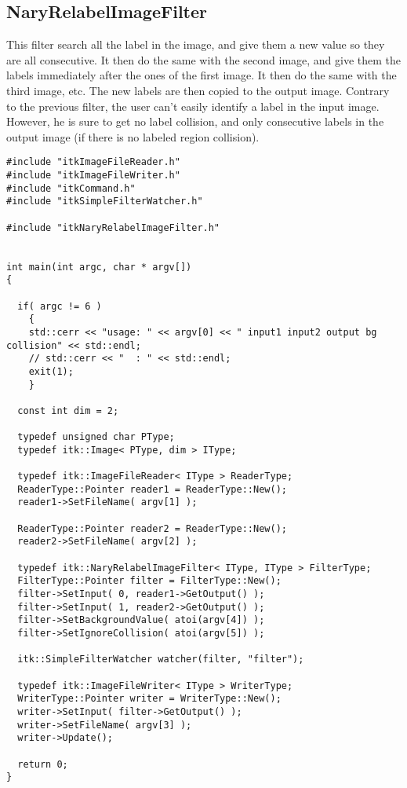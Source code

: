\documentclass{InsightArticle}
\begin{document}
\subsection{NaryRelabelImageFilter}

This filter search all the label in the image, and give them a new value so they are all
consecutive. It then do the same with the second image, and give them the labels immediately
after the ones of the first image. It then do the same with the third image, etc.
The new labels are then copied to the output image.
Contrary to the previous filter, the user can't easily identify a label in the input image.
However, he is sure to get no label collision, and only consecutive labels in the output image
(if there is no labeled region collision).

\small \begin{verbatim}
#include "itkImageFileReader.h"
#include "itkImageFileWriter.h"
#include "itkCommand.h"
#include "itkSimpleFilterWatcher.h"

#include "itkNaryRelabelImageFilter.h"


int main(int argc, char * argv[])
{

  if( argc != 6 )
    {
    std::cerr << "usage: " << argv[0] << " input1 input2 output bg collision" << std::endl;
    // std::cerr << "  : " << std::endl;
    exit(1);
    }

  const int dim = 2;
  
  typedef unsigned char PType;
  typedef itk::Image< PType, dim > IType;

  typedef itk::ImageFileReader< IType > ReaderType;
  ReaderType::Pointer reader1 = ReaderType::New();
  reader1->SetFileName( argv[1] );

  ReaderType::Pointer reader2 = ReaderType::New();
  reader2->SetFileName( argv[2] );

  typedef itk::NaryRelabelImageFilter< IType, IType > FilterType;
  FilterType::Pointer filter = FilterType::New();
  filter->SetInput( 0, reader1->GetOutput() );
  filter->SetInput( 1, reader2->GetOutput() );
  filter->SetBackgroundValue( atoi(argv[4]) );
  filter->SetIgnoreCollision( atoi(argv[5]) );

  itk::SimpleFilterWatcher watcher(filter, "filter");

  typedef itk::ImageFileWriter< IType > WriterType;
  WriterType::Pointer writer = WriterType::New();
  writer->SetInput( filter->GetOutput() );
  writer->SetFileName( argv[3] );
  writer->Update();

  return 0;
}
\end{verbatim} \normalsize
\end{document}
